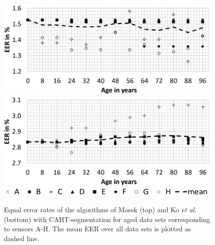 \documentclass[10pt,twocolumn,letterpaper]{article}
\providecommand{\etal}[0]{\textit{et al.} }
\begin{document}
 
  \begin{figure}
  \centering
  \includegraphics[width=\linewidth]{img/lg_caht.png}
  \includegraphics[width=\linewidth]{img/ko_caht.png}
  \includegraphics[width=\linewidth]{img/legend.png}
  \caption{Equal error rates of the algorithms of Masek (top) and Ko \etal (bottom) with CAHT-segmentation for aged data sets corresponding to sensors A-H. The mean EER over all data sets is plotted as dashed line.}
  \label{fig:allSensors}
\end{figure}
 
\end{document}
